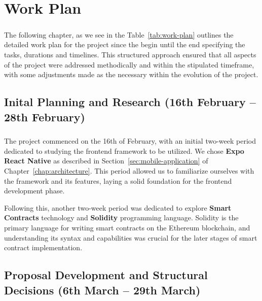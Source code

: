 %
%
\chapter{Work Plan}\label{chap:work-plan}
\paragraph{}

The following chapter, as we see in the Table~\ref{tab:work-plan}  outlines the detailed work plan for the project since the begin until the end specifying the tasks, durations and timelines.
This structured approach ensured that all aspects of the project were addressed methodically and within the stipulated timeframe, with some adjustments made as the necessary within
the evolution of the project.

\section{Inital Planning and Research (16th February – 28th February)}
\paragraph{}

The project commenced on the 16th of February, with an initial two-week period dedicated to studying the frontend framework to be utilized.
We chose \textbf{Expo React Native} as described in Section~\ref{sec:mobile-application} of Chapter~\ref{chap:architecture}.
This period allowed us to familiarize ourselves with the framework and its features, laying a solid foundation for the frontend development phase.

Following this, another two-week period was dedicated to explore \textbf{Smart Contracts} technology and \textbf{Solidity} programming language.
Solidity is the primary language for writing smart contracts on the Ethereum blockchain, and understanding its syntax and capabilities was crucial for
the later stages of smart contract implementation.

\section{Proposal Development and Structural Decisions (6th March – 29th March)}
\paragraph{}


